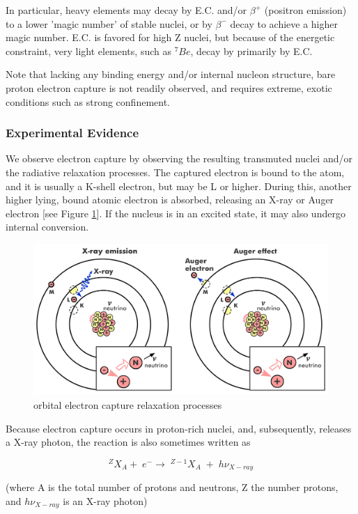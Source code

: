 \documentclass[%
 aip,
 jmp,%
 amsmath,amssymb,
 reprint,%
]{revtex4-1}
\begin{document}
In particular, heavy elements may decay by E.C. and/or $\beta^{+}$ (positron emission) to a lower 'magic number' of stable nuclei, or by $\beta^{-}$ decay to achieve a higher magic number. E.C. is favored for high Z nuclei, but because of the energetic constraint, very light elements, such as $^{7}Be$, decay by primarily by E.C.    

Note that lacking any binding energy and/or internal nucleon structure, bare proton electron capture is not readily observed, and requires extreme, exotic conditions such as strong confinement.

\subsubsection{Experimental Evidence}

We observe electron capture by observing the resulting transmuted nuclei and/or the radiative relaxation processes.  The captured electron is bound to the atom, and it is usually a K-shell electron, but may be L or higher.  During this, another higher lying, bound atomic electron is absorbed, releasing an X-ray or Auger electron [see Figure \ref{fig:ec1}].  If the nucleus is in an excited state, it may also  undergo internal conversion.  

\begin{figure}
   \includegraphics[scale=0.04]{img/EC-img.png}
   \caption{orbital electron capture relaxation processes}
  \label{fig:ec1}
\end{figure}

Because electron capture occurs in proton-rich nuclei, and, subsequently, releases a X-ray photon, the reaction is also sometimes written as

$$^{Z}X_{A}+\;e^{-}\rightarrow\;^{Z-1}X_{A}\;+\;h\nu_{X-ray}$$

(where A is the total number of protons and neutrons, Z the number protons, and $h\nu_{X-ray}$ is an X-ray photon)
\end{document}
